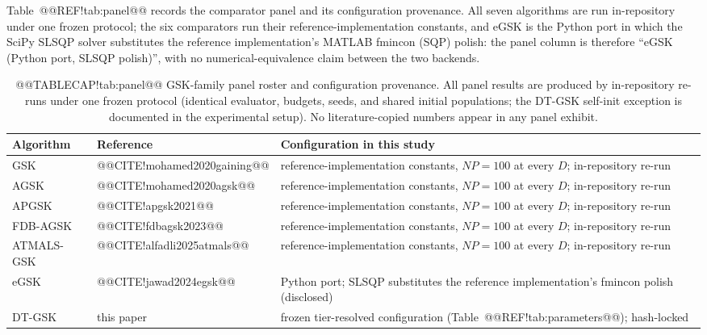 \documentclass[10pt,a4paper]{article}
\newcommand{\dtgsk}{DT-GSK}
\begin{document}
Table~@@REF!tab:panel@@ records the comparator panel and its
configuration provenance.
All seven algorithms are run in-repository under one frozen protocol;
the six comparators run their reference-implementation constants, and eGSK
is the Python port in which the SciPy SLSQP solver substitutes the
reference implementation's MATLAB fmincon (SQP) polish: the panel column is
therefore ``eGSK (Python port, SLSQP polish)'', with no
numerical-equivalence claim between the two
backends. 


\begin{table}[H]
\caption{@@TABLECAP!tab:panel@@ GSK-family panel roster and configuration provenance.
All panel results are produced by in-repository
re-runs under one frozen protocol (identical evaluator, budgets,
seeds, and shared initial populations; the \dtgsk{} self-init
exception is documented in the experimental setup). No
literature-copied numbers appear in any panel exhibit.}
\label{tab:panel}
\small
\begin{tabular}{lll}
\toprule
\textbf{Algorithm} & \textbf{Reference} & \textbf{Configuration in this study}\\
\midrule
GSK & @@CITE!mohamed2020gaining@@ & reference-implementation constants, $NP=100$ at every $D$; in-repository re-run\\
AGSK & @@CITE!mohamed2020agsk@@ & reference-implementation constants, $NP=100$ at every $D$; in-repository re-run\\
APGSK & @@CITE!apgsk2021@@ & reference-implementation constants, $NP=100$ at every $D$; in-repository re-run\\


FDB-AGSK & @@CITE!fdbagsk2023@@ & reference-implementation constants, $NP=100$ at every $D$; in-repository re-run\\
ATMALS-GSK & @@CITE!alfadli2025atmals@@ & reference-implementation constants, $NP=100$ at every $D$; in-repository re-run\\
eGSK & @@CITE!jawad2024egsk@@ & Python port; SLSQP substitutes the
reference implementation's fmincon polish (disclosed)\\
\dtgsk{} & this paper & frozen tier-resolved configuration
(Table~@@REF!tab:parameters@@); hash-locked\\
\bottomrule
\end{tabular}
\end{table}
\end{document}
